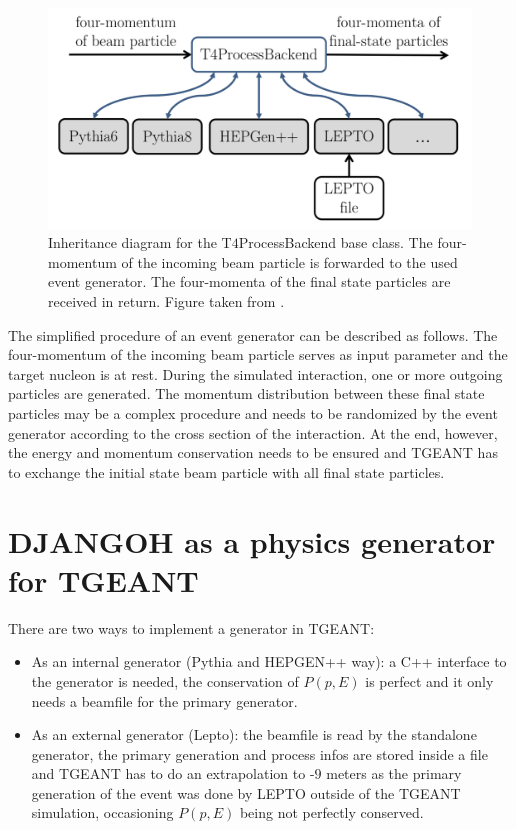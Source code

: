 \begin{figure}[!h]
  \centering
	\includegraphics[scale=0.5]{./gfx/Processbackend.png}
	\caption{Inheritance diagram for the T$4$ProcessBackend base class. The four- momentum of the incoming beam particle is forwarded to the used event generator. The four-momenta of the final state particles are received in return. Figure taken from \cite{Tobias}.}
	\label{pic:Processbackend}
\end{figure}

The simplified procedure of an event generator can be described as follows. The four-momentum of the incoming beam particle serves as input parameter and the target nucleon is at rest. During the simulated interaction, one or more outgoing particles are generated. The momentum distribution between these final state particles may be a complex procedure and needs to be randomized by the event generator according to the cross section of the interaction. At the end, however, the energy and momentum conservation needs to be ensured and TGEANT has to exchange the initial state beam particle with all final state particles.



\section{DJANGOH as a physics generator for TGEANT}

There are two ways to implement a generator in TGEANT:
\begin{itemize}
\item As an internal generator (Pythia and HEPGEN++ way): a C++ interface to the generator is needed, the conservation of $P(p,E)$ is perfect and it only needs a beamfile for the primary generator.
\item As an external generator (Lepto): the beamfile is read by the standalone
generator, the primary generation and process infos are stored inside a file and TGEANT has to do an extrapolation to -$9$ meters as the primary generation of the event was done by LEPTO outside of the TGEANT simulation, occasioning $P(p,E)$ being not perfectly conserved.
\end{itemize}

